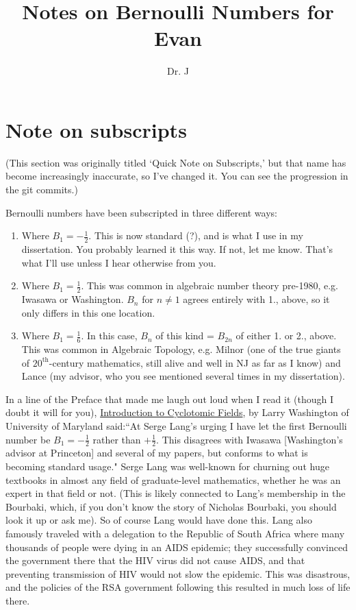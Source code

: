 \documentclass[12pt]{article}
\title{Notes on Bernoulli Numbers for Evan}
\author{Dr. J}
\begin{document}
\maketitle

\section{Note on subscripts}

(This section was originally titled `Quick Note on Subscripts,' but that name has become increasingly inaccurate, so I've changed it.  You can see the progression in the git commits.)

Bernoulli numbers have been subscripted in three different ways:
\begin{enumerate}
	\item
Where $B_1 = -\frac{1}{2}$.  This is now standard (?), and is what I use in my dissertation.  You probably learned it this way.  If not, let me know.  That's what I'll use unless I hear otherwise from you.
	\item
Where $B_1 = \frac{1}{2}$.  This was common in algebraic number theory pre-1980, e.g. Iwasawa or Washington.  $B_n$ for $n \neq 1$ agrees entirely with 1., above, so it only differs in this one location.
	\item
Where $B_1 = \frac{1}{6}$.  In this case, $B_n$ of this kind = $B_{2n}$ of either 1. or 2., above.  This was common in Algebraic Topology, e.g. Milnor (one of the true giants of $20^{\text{th}}$-century mathematics, still alive and well in NJ as far as I know) and Lance (my advisor, who you see mentioned several times in my dissertation).
\end{enumerate}

In a line of the Preface that made me laugh out loud when I read it (though I doubt it will for you), \underline{Introduction to Cyclotomic Fields}, by Larry Washington of University of Maryland said:``At Serge Lang's urging I have let the first Bernoulli number be $B_1 = -\frac{1}{2}$ rather than $+\frac{1}{2}$.  This disagrees with Iwasawa [Washington's advisor at Princeton] and several of my papers, but conforms to what is becoming standard usage."  Serge Lang was well-known for churning out huge textbooks in almost any field of graduate-level mathematics, whether he was an expert in that field or not.  (This is likely connected to Lang's membership in the Bourbaki, which, if you don't know the story of Nicholas Bourbaki, you should look it up or ask me).  So of course Lang would have done this.  Lang also famously traveled with a delegation to the Republic of South Africa where many thousands of people were dying in an AIDS epidemic; they successfully convinced the government there that the HIV virus did not cause AIDS, and that preventing transmission of HIV would not slow the epidemic.  This was disastrous, and the policies of the RSA government following this resulted in much loss of life there.
\end{document}
